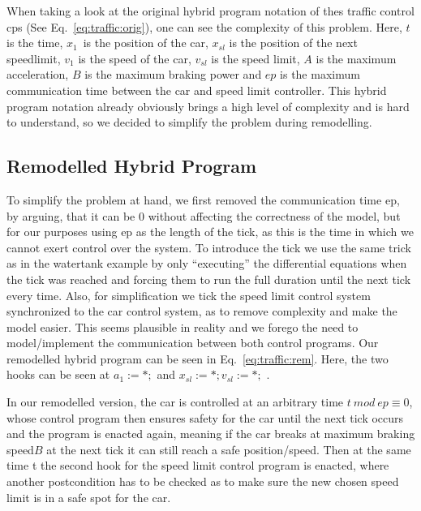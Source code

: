 When taking a look at the original hybrid program notation of thes traffic control cps (See Eq.~\ref{eq:traffic:orig}), one can see the complexity of this problem. Here, \(t\) is the time, \(x_1\)\ is the position of the car, \(x_{sl}\) is the position of the next speedlimit, \(v_1\) is the speed of the car, \(v_{sl}\) is the speed limit, \(A\) is the maximum acceleration, \(B\) is the maximum braking power and \(ep\) is the maximum communication time between the car and speed limit controller. This hybrid program notation already obviously brings a high level of complexity and is hard to understand, so we decided to simplify the problem during remodelling. 

\subsection{Remodelled Hybrid Program}
\label{subsec:traffic:remodel}
To simplify the problem at hand, we first removed the communication time ep, by arguing, that it can be 0 without affecting the correctness of the model, but for our purposes using ep as the length of the tick, as this is the time in which we cannot exert control over the system. To introduce the tick we use the same trick as in the watertank example by only ``executing'' the differential equations when the tick was reached and forcing them to run the full duration until the next tick every time. Also, for simplification we tick the speed limit control system synchronized to the car control system, as to remove complexity and make the model easier. This seems plausible in reality and we forego the need to model/implement the communication between both control programs. Our remodelled hybrid program can be seen in Eq.~\ref{eq:traffic:rem}. Here, the two hooks can be seen at \(a_1:=*;\) and \(x_{sl} :=*; v_{sl} := *;\) .

In our remodelled version, the car is controlled at an arbitrary time \(t~mod~ep\equiv0\), whose control program then ensures safety for the car until the next tick occurs and the program is enacted again, meaning if the car breaks at maximum braking speed\( B\) at the next tick it can still reach a safe position/speed. Then at the same time t the second hook for the speed limit control program is enacted, where another postcondition has to be checked as to make sure the new chosen speed limit is in a safe spot for the car.


